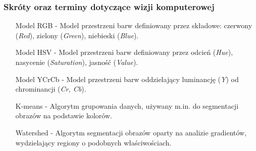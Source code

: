 \subsubsection*{Skróty oraz terminy dotyczące wizji komputerowej}

\begin{itemize}
    \item[Model RGB] - Model przestrzeni barw definiowany przez składowe: czerwony (\textit{Red}), zielony (\textit{Green}), niebieski (\textit{Blue}).
    \item[Model HSV] - Model przestrzeni barw definiowany przez odcień (\textit{Hue}), nasycenie (\textit{Saturation}), jasność (\textit{Value}).
    \item[Model YCrCb] - Model przestrzeni barw oddzielający luminancję (\textit{Y}) od chrominancji (\textit{Cr, Cb}).
    \item[K-means] - Algorytm grupowania danych, używany m.in. do segmentacji obrazów na podstawie kolorów.
    \item[Watershed] - Algorytm segmentacji obrazów oparty na analizie gradientów, wydzielający regiony o podobnych właściwościach.
\end{itemize}
